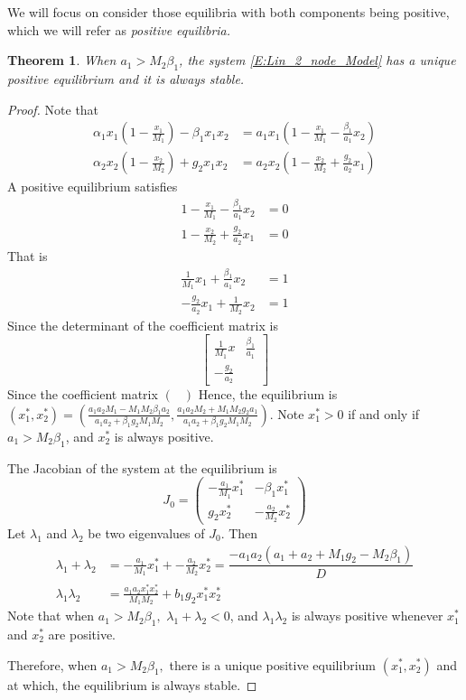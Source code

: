 \documentclass{article}
\newcommand{\Matrixc}[1]{\ensuremath{\left(\begin{array}{cccccccccccc} #1 \end{array}\right)}}
\newcommand{\Matrixs}[1]{\ensuremath{\left[\begin{array}{cccccccccccc} #1 \end{array}\right]}}
\newtheorem{theorem}{Theorem}[section]
\begin{document}
We will focus on consider those equilibria with both components being positive, which we will refer as {\em positive equilibria.}

\begin{theorem}
When $a_1 > M_2 \beta_1$,  the system \eqref{E:Lin_2_node_Model} has a unique positive equilibrium and it is always stable.
\end{theorem}

\begin{proof}
Note that 
\[
\begin{array}{rl}
    \alpha_1 x_1(1-\frac{x_1}{M_1}) - \beta_1 x_1 x_2  & = a_1x_1(1-\frac{x_1}{M_1} - \frac{\beta_1}{a_1} x_2) \\
    \alpha_2 x_2 (1-\frac{x_2}{M_2}) + g_2 x_1x_2& =  a_2x_2(1-\frac{x_2}{M_2} + \frac{g_2}{a_2} x_1)
\end{array}
\]
A positive  equilibrium  satisfies
\begin{equation}
    \begin{array}{rl}
     1-\frac{x_1}{M_1} - \frac{\beta_1}{a_1} x_2 & = 0\\
     1-\frac{x_2}{M_2} + \frac{g_2}{a_2} x_1 & = 0
\end{array}
\end{equation}
That is 
\[
\begin{array}{rl}
  \frac{1}{M_1} x_1    + \frac{\beta_1}{a_1} x_2 &= 1 \\
  -\frac{g_2}{a_2} x_1 +    \frac{1}{M_2} x_2  &  = 1
\end{array}
\]
Since the determinant of the coefficient matrix is 
\[
\Matrixs{\frac{1}{M_1} x & \frac{\beta_1}{a_1} \\
-\frac{g_2}{a_2}  
}
\]
Since the coefficient matrix $\Matrixc{}$
Hence, the equilibrium is $(x_1^*, x_2^*) = (\frac{a_1a_2M_1 -M_1 M_2 \beta_1 a_2}{a_1a_2 + \beta_1 g_2M_1M_2},\frac{a_1a_2M_2 +M_1 M_2 g_2 a_1}{a_1a_2 + \beta_1 g_2M_1M_2}).$
Note $x_1^*>0$ if and only if  $a_1 > M_2 \beta_1$, and $x_2^*$ is always positive.

The Jacobian of the system at the equilibrium is 
 \[
J_0 = \Matrixc{-\frac{a_1}{M_1}x_1^*&  - \beta_1 x_1^* \\
g_2 x_2^* & -\frac{a_2}{M_2} x_2^*
}
\]
Let $\lambda_1$ and $\lambda_2$ be two eigenvalues of $J_0$. Then 
\[
\begin{array}{rl}
\lambda_1 + \lambda_2&= -\frac{a_1}{M_1}x_1^* + -\frac{a_2}{M_2} x_2^*  = \dfrac{-a_1a_2(a_1+a_2+M_1g_2 - M_2 \beta_1)}{D} \\
\lambda_1 \lambda_2 & = \frac{a_1a_2x_1^*x_2^*}{M_1M_2} + b_1 g_2 x_1^*x_2^*
\end{array}
\]
Note that when  $a_1 > M_2 \beta_1,$ $\lambda_1 + \lambda_2<0$, and $\lambda_1 \lambda_2$ is always positive whenever $x_1^*$ and $x_2^*$ are positive.  

Therefore, when  $a_1 > M_2 \beta_1,$ there is a unique positive equilibrium $(x_1^*, x_2^*)$ and at which, the equilibrium is always stable. 

\end{proof}
\end{document}
